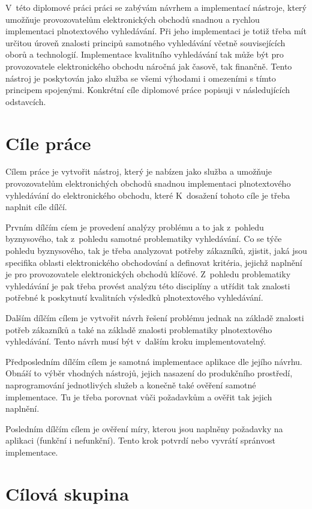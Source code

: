 \documentclass[FM,DP]{tulthesis}
\begin{document}
V~této diplomové práci práci se zabývám návrhem a implementací nástroje, který umožňuje
provozovatelům elektronických obchodů snadnou a rychlou implementaci plnotextového vyhledávání. 
Při jeho implementaci je totiž třeba mít určitou úroveň znalosti principů samotného 
vyhledávání včetně souvisejících oborů a technologií. Implementace kvalitního vyhledávání
tak může být pro provozovatele elektronického obchodu náročná jak časově, tak finančně.
Tento nástroj je poskytován jako služba se všemi výhodami i omezeními s tímto principem spojenými. 
Konkrétní cíle diplomové práce popisuji v následujících odstavcích.

\section{Cíle práce}

Cílem práce je vytvořit nástroj, který je nabízen jako služba a umožňuje provozovatelům elektronichých
obchodů snadnou implementaci plnotextového vyhledávání do elektronického obchodu, které 
K~dosažení tohoto cíle je třeba naplnit cíle dílčí.

Prvním dílčím cíem je provedení analýzy problému a to jak z~pohledu byznysového, tak
z~pohledu samotné problematiky vyhledávání. Co se týče pohledu byznysového, tak je třeba
analyzovat potřeby zákazníků, zjistit, jaká jsou specifika oblasti elektronického obchodování
a definovat kritéria, jejichž naplnění je pro provozovatele elektronických obchodů klíčové. 
Z~pohledu problematiky vyhledávání je pak třeba provést analýzu této disciplíny a utřídit
tak znalosti potřebné k poskytnutí kvalitních výsledků plnotextového vyhledávání.

Dalším dílčím cílem je vytvořit návrh řešení problému jednak na základě znalosti potřeb
zákazníků a také na základě znalosti problematiky plnotextového vyhledávání. Tento návrh musí 
být v~dalším kroku implementovatelný.

Předposledním dílčím cílem je samotná implementace aplikace dle jejího návrhu. Obnáší to výběr 
vhodných nástrojů, jejich nasazení do produkčního prostředí, naprogramování jednotlivých
služeb a konečně také ověření samotné implementace. Tu je třeba porovnat vůči požadavkům
a ověřit tak jejich naplnění.

Posledním dílčím cílem je ověření míry, kterou jsou naplněny požadavky na aplikaci 
(funkční i nefunkční). Tento krok potvrdí nebo vyvrátí spránvost implementace.

\section{Cílová skupina}
\end{document}
